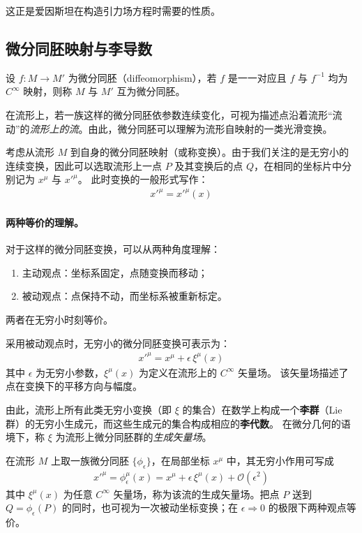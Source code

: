这正是爱因斯坦在构造引力场方程时需要的性质。

  \subsection{微分同胚映射与李导数}

设 $f: M \rightarrow M'$ 为微分同胚（diffeomorphism），若 $f$ 是一一对应且 $f$ 与 $f^{-1}$ 均为 $C^\infty$ 映射，则称 $M$ 与 $M'$ 互为微分同胚。

在流形上，若一族这样的微分同胚依参数连续变化，可视为描述点沿着流形“流动”的\emph{流形上的流}。由此，微分同胚可以理解为流形自映射的一类光滑变换。

\vspace{0.5em}
考虑从流形 $M$ 到自身的微分同胚映射（或称变换）。由于我们关注的是无穷小的连续变换，因此可以选取流形上一点 $P$ 及其变换后的点 $Q$，在相同的坐标片中分别记为 $x^\mu$ 与 $x'^{\mu}$。  
此时变换的一般形式写作：
\begin{align}
x'^{\mu} = x'^{\mu}(x) \nonumber
\end{align}

\paragraph{两种等价的理解。}
对于这样的微分同胚变换，可以从两种角度理解：
\begin{enumerate}[label=(\arabic*)]
  \item 主动观点：坐标系固定，点随变换而移动；
  \item 被动观点：点保持不动，而坐标系被重新标定。
\end{enumerate}
两者在无穷小时刻等价。

\vspace{0.5em}
采用被动观点时，无穷小的微分同胚变换可表示为：
\begin{align}
x'^{\mu} = x^{\mu} + \epsilon\,\xi^{\mu}(x) \nonumber
\end{align}
其中 $\epsilon$ 为无穷小参数，$\xi^{\mu}(x)$ 为定义在流形上的 $C^\infty$ 矢量场。  
该矢量场描述了点在变换下的平移方向与幅度。

\vspace{0.5em}
由此，流形上所有此类无穷小变换（即 $\xi$ 的集合）在数学上构成一个\textbf{李群}（Lie 群）的无穷小生成元，而这些生成元的集合构成相应的\textbf{李代数}。  
在微分几何的语境下，称 $\xi$ 为流形上微分同胚群的\emph{生成矢量场}。

\begin{definition}[流与生成矢量场]
在流形 $M$ 上取一族微分同胚 $\{\phi_\epsilon\}$，在局部坐标 $x^\mu$ 中，其无穷小作用可写成
\begin{align}
x'^{\mu}=\phi_\epsilon^\mu(x)=x^\mu+\epsilon\,\xi^\mu(x)+\mathcal{O}(\epsilon^2) \nonumber
\end{align}
其中 $\xi^\mu(x)$ 为任意 $C^\infty$ 矢量场，称为该流的生成矢量场。把点 $P$ 送到 $Q=\phi_\epsilon(P)$ 的同时，也可视为一次被动坐标变换；在 $\epsilon\Rightarrow0$ 的极限下两种观点等价。
\end{definition}

